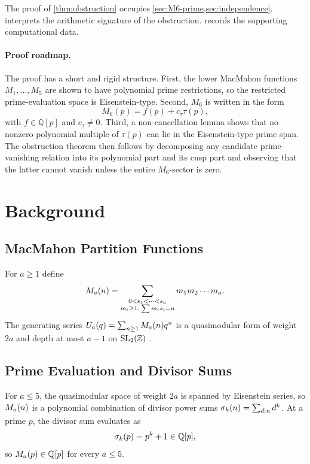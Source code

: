 \documentclass[11pt]{article}
\begin{document}
The proof of \cref{thm:obstruction} occupies \cref{sec:M6-prime,sec:independence}.
 interprets the arithmetic signature of the obstruction.
 records the supporting computational data.

\paragraph{Proof roadmap.}
The proof has a short and rigid structure.
First, the lower MacMahon functions $M_1,\dots,M_5$ are shown to have polynomial prime
restrictions, so the restricted prime-evaluation space is Eisenstein-type.
Second, $M_6$ is written in the form
\[
  M_6(p) = f(p) + c_\tau\tau(p),
\]
with $f\in\mathbb{Q}[p]$ and $c_\tau\ne 0$.
Third, a non-cancellation lemma shows that no nonzero polynomial multiple of $\tau(p)$
can lie in the Eisenstein-type prime span.
The obstruction theorem then follows by decomposing any candidate prime-vanishing relation
into its polynomial part and its cusp part and observing that the latter cannot vanish
unless the entire $M_6$-sector is zero.

\section{Background}
\label{sec:background}

\subsection{MacMahon Partition Functions}

For $a\ge 1$ define
\[
  M_{a}(n) = \sum_{\substack{0<s_1<\cdots<s_a \\ m_i\ge 1,\;\sum m_i s_i=n}}
              m_1 m_2\cdots m_a.
\]
The generating series $U_{a}(q)=\sum_{n\ge 1}M_{a}(n)q^n$ is a quasimodular form of
weight $2a$ and depth at most $a-1$ on $\operatorname{SL}_2(\mathbb{Z})$ \cite{CIO2024,KZ1995}.

\subsection{Prime Evaluation and Divisor Sums}

For $a\le 5$, the quasimodular space of weight $2a$ is spanned by Eisenstein series, so
$M_{a}(n)$ is a polynomial combination of divisor power sums
$\sigma_{k}(n)=\sum_{d\mid n}d^k$.
At a prime $p$, the divisor sum evaluates as
\[
  \sigma_{k}(p) = p^k + 1 \in \mathbb{Q}[p],
\]
so $M_{a}(p)\in\mathbb{Q}[p]$ for every $a\le 5$.
\end{document}
